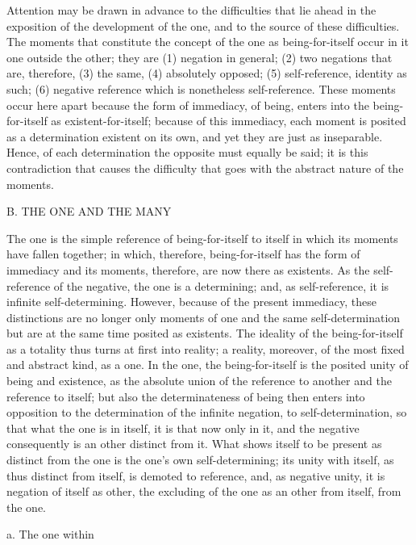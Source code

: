 Attention may be drawn in advance to the difficulties that lie ahead
in the exposition of the development of the one,
and to the source of these difficulties.
The moments that constitute the concept of
the one as being-for-itself
occur in it one outside the other;
they are
(1) negation in general;
(2) two negations that are, therefore,
(3) the same,
(4) absolutely opposed;
(5) self-reference, identity as such;
(6) negative reference which is nonetheless self-reference.
These moments occur here apart because
the form of immediacy, of being, enters into
the being-for-itself as existent-for-itself;
because of this immediacy, each moment is posited
as a determination existent on its own,
and yet they are just as inseparable.
Hence, of each determination the opposite must equally be said;
it is this contradiction that causes the difficulty
that goes with the abstract nature of the moments.

B. THE ONE AND THE MANY

The one is the simple reference
of being-for-itself to itself
in which its moments have fallen together;
in which, therefore, being-for-itself has the form
of immediacy and its moments,
therefore, are now there as existents.
As the self-reference of the negative,
the one is a determining;
and, as self-reference,
it is infinite self-determining.
However, because of the present immediacy,
these distinctions are no longer only moments
of one and the same self-determination
but are at the same time posited as existents.
The ideality of the being-for-itself as a totality
thus turns at first into reality;
a reality, moreover, of the most
fixed and abstract kind, as a one.
In the one, the being-for-itself is
the posited unity of being and existence,
as the absolute union of the reference to another
and the reference to itself;
but also the determinateness of being
then enters into opposition to the determination
of the infinite negation, to self-determination,
so that what the one is in itself,
it is that now only in it,
and the negative consequently is
an other distinct from it.
What shows itself to be present
as distinct from the one is
the one's own self-determining;
its unity with itself, as thus distinct from itself,
is demoted to reference, and, as negative unity,
it is negation of itself as other,
the excluding of the one
as an other from itself,
from the one.

a. The one within

